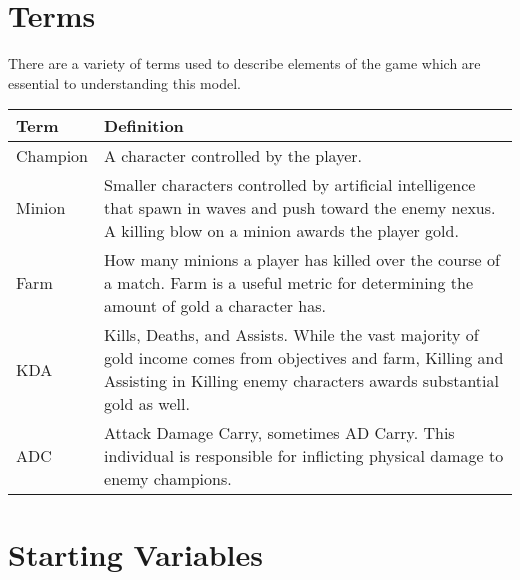 \documentclass{article}
\begin{document}
\section{Terms}
There are a variety of terms used to describe elements of the game which are essential to understanding this model. \\
\begin{tabular}{| l| L| }
   Term & Definition\\ \hline
   Champion & A character controlled by the player.\\ \hline
   Minion & Smaller characters controlled by artificial intelligence that spawn in waves and push toward the enemy nexus.  A killing blow on a minion awards the player gold.\\ \hline
   Farm &  How many minions a player has killed over the course of a match.  Farm is a useful metric for determining the amount of gold a character has. \\ \hline
   KDA & Kills, Deaths, and Assists. While the vast majority of gold income comes from objectives and farm, Killing and Assisting in Killing enemy characters awards substantial gold as well. \\ \hline
   ADC & Attack Damage Carry, sometimes AD Carry.  This individual is responsible for inflicting physical damage to enemy champions. \\ \hline
   
\end{tabular}
\section{Starting Variables}
\end{document}
